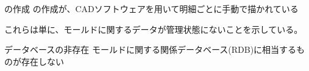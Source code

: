 \begin{Issues}{\nameDrawing の作成}
\nameDrawing の作成が、CADソフトウェアを用いて明細ごとに手動で描かれている
\end{Issues}
これらは単に、モールドに関するデータが管理状態にないことを示している。
\begin{Issues}{データベースの非存在}
モールドに関する関係データベース(RDB)に相当するものが存在しない
\end{Issues}

